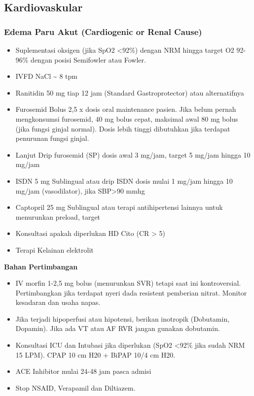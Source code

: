\documentclass[
]{book}
\providecommand{\tightlist}{%
  \setlength{\itemsep}{0pt}\setlength{\parskip}{0pt}}
\begin{document}
\hypertarget{kardiovaskular-1}{%
\subsection{Kardiovaskular}\label{kardiovaskular-1}}

\hypertarget{edema-paru-akut-cardiogenic-or-renal-cause}{%
\subsubsection{Edema Paru Akut (Cardiogenic or Renal Cause)}\label{edema-paru-akut-cardiogenic-or-renal-cause}}

\begin{itemize}
\tightlist
\item
  Suplementasi oksigen (jika SpO2 \textless92\%) dengan NRM hingga target O2 92-96\% dengan posisi Semifowler atau Fowler.
\item
  IVFD NaCl \textasciitilde{} 8 tpm
\item
  Ranitidin 50 mg tiap 12 jam (Standard Gastroprotector) atau alternatifnya
\item
  Furosemid Bolus 2,5 x dosis oral maintenance pasien. Jika belum pernah mengkonsumsi furosemid, 40 mg bolus cepat, maksimal awal 80 mg bolus (jika fungsi ginjal normal). Dosis lebih tinggi dibutuhkan jika terdapat penurunan fungsi ginjal.
\item
  Lanjut Drip furosemid (SP) dosis awal 3 mg/jam, target 5 mg/jam hingga 10 mg/jam
\item
  ISDN 5 mg Sublingual atau drip ISDN dosis mulai 1 mg/jam hingga 10 mg/jam (vasodilator), jika SBP\textgreater90 mmhg
\item
  Captopril 25 mg Sublingual atau terapi antihipertensi lainnya untuk menurunkan preload, target
\item
  Konsultasi apakah diperlukan HD Cito (CR \textgreater{} 5)
\item
  Terapi Kelainan elektrolit
\end{itemize}

\textbf{Bahan Pertimbangan}

\begin{itemize}
\tightlist
\item
  IV morfin 1-2,5 mg bolus (menurunkan SVR) tetapi saat ini kontroversial. Pertimbangkan jika terdapat nyeri dada resistent pemberian nitrat. Monitor kesadaran dan usaha napas.
\item
  Jika terjadi hipoperfusi atau hipotensi, berikan inotropik (Dobutamin, Dopamin). Jika ada VT atau AF RVR jangan gunakan dobutamin.
\item
  Konsultasi ICU dan Intubasi jika diperlukan (SpO2 \textless92\% jika sudah NRM 15 LPM). CPAP 10 cm H20 + BiPAP 10/4 cm H20.
\item
  ACE Inhibitor mulai 24-48 jam pasca admisi
\item
  Stop NSAID, Verapamil dan Diltiazem.
\end{itemize}
\end{document}
